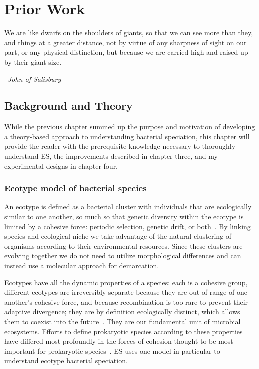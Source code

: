 \chapter{Prior Work}


\begin{shadequote}
We are like dwarfs on the shoulders of giants, so that we can see more than they, and things at a greater distance, not by virtue of any sharpness of sight on our part, or any physical distinction, but because we are carried high and raised up by their giant size.\par--\emph{John of Salisbury}
\end{shadequote}

\section{Background and Theory}
While the previous chapter summed up the purpose and motivation of developing a theory-based approach to understanding bacterial speciation, this chapter will provide the reader with the prerequisite knowledge necessary to thoroughly understand ES, the improvements described in chapter three, and my experimental designs in chapter four.

\subsection*{Ecotype model of bacterial species}
An ecotype is defined as a bacterial cluster with individuals that are ecologically similar to one another, so much so that genetic diversity within the ecotype is limited by a cohesive force: periodic selection, genetic drift, or both~\cite{cohan2007systematics}.
By linking species and ecological niche we take advantage of the natural clustering of organisms according to their environmental resources.
Since these clusters are evolving together we do not need to utilize morphological differences and can instead use a molecular approach for demarcation.

Ecotypes have all the dynamic properties of a species: each is a cohesive group, different ecotypes are irreversibly separate because they are out of range of one another's cohesive force, and because recombination is too rare to prevent their adaptive divergence; they are by definition ecologically distinct, which allows them to coexist into the future~\cite{cohan2007systematics}.
They are our fundamental unit of microbial ecosystems.
Efforts to define prokaryotic species according to these properties have differed most profoundly in the forces of cohesion thought to be most important for prokaryotic species~\cite{cohan2008origins}.
ES uses one model in particular to understand ecotype bacterial speciation.

